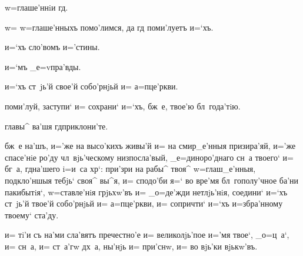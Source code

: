 
  w=глаше'ннiи гд.


 w= w=глаше'нныхъ помо'лимся, да гд 
поми'луетъ и=`хъ.


 и=`хъ сло'вомъ и='стины.


 и=`мъ _е=v пра'вды.


 и=`хъ ст~jь'й свое'й собо'рнjьй и= 
а=п це'ркви.


 поми'луй, заступи` и= сохрани` и=`хъ, бж~е, 
твое'ю бл~года'тiю.


 главы^ ва'шя гд приклони'те.



 бж~е на'шъ, и='же на высо'кихъ живы'й и= на 
смир_е'нныя призира'яй, и='же спасе'нiе ро'ду 
чл~вjь'ческому низпосла'вый, _е=диноро'днаго сн~а твоего` 
и= бг~а, гд на'шего i=и~са хр`: при'зри на рабы^ 
твоя^ w=глаш_е'нныя, подкло'ншыя тебjь` своя^ вы^я, и= 
сподо'би я=` во вре'мя бл~гополу'чное ба'ни пакибытiя`, 
w=ставле'нiя грjьхw'въ и= _о=де'жди нетлjь'нiя, соедини` 
и=`хъ ст~jь'й твое'й собо'рнjьй и= а=п це'ркви, 
и= сопричти` и=`хъ и=збра'нному твоему` ста'ду.

  и= тi'и съ на'ми сла'вятъ пречестно'е 
и= великолjь'пое и='мя твое`, _о=ц~а`, и= сн~а, и= 
ст~а'гw дх~а, ны'нjь и= при'снw, и= во вjь'ки вjькw'въ.



